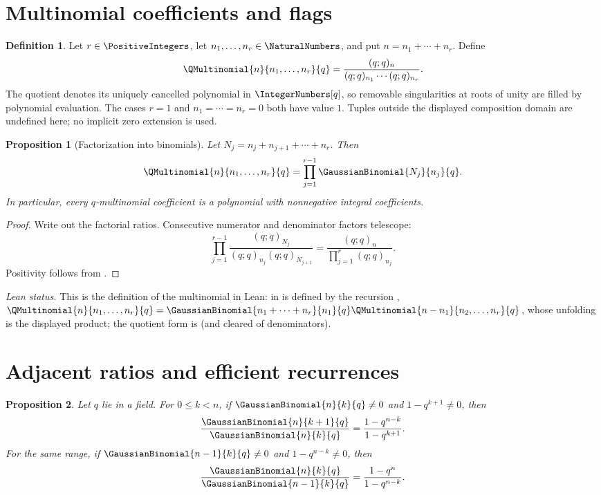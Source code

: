 \documentclass[11pt,a4paper,oneside,openany]{book}
\newtheorem{proposition}[proposition]{Proposition}
\theoremstyle{definition}
\newtheorem{definition}[definition]{Definition}
\theoremstyle{remark}
\begin{document}
\section{Multinomial coefficients and flags}

\begin{definition}
Let $r\in\PositiveIntegers$, let
$n_1,\dots,n_r\in\NaturalNumbers$, and put
$n=n_1+\cdots+n_r$.  Define
\[
 \QMultinomial{n}{n_1,\ldots,n_r}{q}
 =\frac{(q;q)_n}{(q;q)_{n_1}\cdots(q;q)_{n_r}}.
\]
The quotient denotes its uniquely cancelled polynomial in
$\IntegerNumbers[q]$, so removable singularities at roots of unity are filled
by polynomial evaluation.  The cases $r=1$ and
$n_1=\cdots=n_r=0$ both have value $1$.  Tuples outside the displayed
composition domain are undefined here; no implicit zero extension is used.
\end{definition}

\begin{proposition}[Factorization into binomials]\label{prop:qmult-factor}
Let $N_j=n_j+n_{j+1}+\cdots+n_r$.  Then
\[
 \QMultinomial{n}{n_1,\ldots,n_r}{q}
 =\prod_{j=1}^{r-1}\GaussianBinomial{N_j}{n_j}{q}.
\]
In particular, every $q$-multinomial coefficient is a polynomial with nonnegative integral coefficients.
\end{proposition}

\begin{proof}
Write out the factorial ratios.  Consecutive numerator and denominator factors telescope:
\[
 \prod_{j=1}^{r-1}
 \frac{(q;q)_{N_j}}{(q;q)_{n_j}(q;q)_{N_{j+1}}}
 =\frac{(q;q)_n}{\prod_{j=1}^{r}(q;q)_{n_j}}.
\]
Positivity follows from .
\end{proof}

\emph{Lean status.}  This is the definition of the multinomial in Lean:
 in  is defined by the recursion
,
$\QMultinomial{n}{n_1,\ldots,n_r}{q}=\GaussianBinomial{n_1+\cdots+n_r}{n_1}{q}\QMultinomial{n-n_1}{n_2,\ldots,n_r}{q}$,
whose unfolding is the displayed product; the quotient form is
 (and 
cleared of denominators).


\section{Adjacent ratios and efficient recurrences}

\begin{proposition}\label{prop:adjacent-ratio}
Let $q$ lie in a field.  For $0\le k<n$, if
$\GaussianBinomial{n}{k}{q}\ne0$ and $1-q^{k+1}\ne0$, then
\[
 \frac{\GaussianBinomial{n}{k+1}{q}}{\GaussianBinomial{n}{k}{q}}
 =\frac{1-q^{n-k}}{1-q^{k+1}}.
\]
For the same range, if $\GaussianBinomial{n-1}{k}{q}\ne0$ and
$1-q^{n-k}\ne0$, then
\[
 \frac{\GaussianBinomial{n}{k}{q}}{\GaussianBinomial{n-1}{k}{q}}
 =\frac{1-q^n}{1-q^{n-k}}.
\]
\end{proposition}
\end{document}
